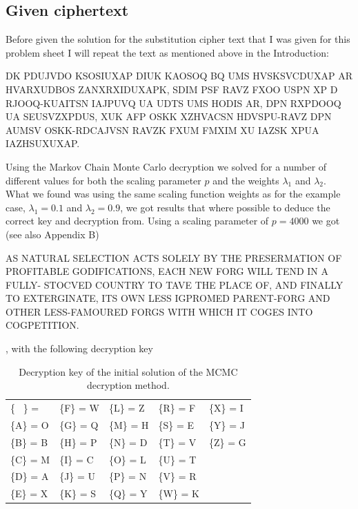 \documentclass[a4paper, 11pt]{article}
\begin{document}
\subsection{Given ciphertext}

Before given the solution for the substitution cipher text that I was given
for this problem sheet I will repeat the text as mentioned above in the
Introduction:

\begin{adjustwidth}{1.5em}{0pt}
  \small
  DK PDUJVDO KSOSIUXAP DIUK KAOSOQ BQ UMS HVSKSVCDUXAP AR
  HVARXUDBOS ZANXRXIDUXAPK, SDIM PSF RAVZ FXOO USPN XP D RJOOQ-KUAITSN 
  IAJPUVQ UA UDTS UMS HODIS AR, DPN RXPDOOQ UA SEUSVZXPDUS, XUK
  AFP OSKK XZHVACSN HDVSPU-RAVZ DPN AUMSV OSKK-RDCAJVSN RAVZK FXUM
  FMXIM XU IAZSK XPUA IAZHSUXUXAP.
\end{adjustwidth}

Using the Markov Chain Monte Carlo decryption we solved for a number of
different values for both the scaling parameter $p$ and the weights 
$\lambda_1$ and $\lambda_2$. What we found was using the same scaling function
weights as for the example case, $\lambda_1 = 0.1$ and $\lambda_2 = 0.9$,
we got results that where possible to deduce the correct key and decryption
from. Using a scaling parameter of $p = 4000$ we got (see also Appendix B)

\begin{adjustwidth}{1.5em}{0pt}
  \small
  AS NATURAL SELECTION ACTS SOLELY BY THE PRESERMATION OF
  PROFITABLE GODIFICATIONS, EACH NEW FORG WILL TEND IN A FULLY-
  STOCVED COUNTRY TO TAVE THE PLACE OF, AND FINALLY TO EXTERGINATE, ITS
  OWN LESS IGPROMED PARENT-FORG AND OTHER LESS-FAMOURED FORGS WITH
  WHICH IT COGES INTO COGPETITION.
\end{adjustwidth}

, with the following decryption key

\begin{table}[h]
  \centering
  \caption{Decryption key of the initial solution of the MCMC decryption 
  method.}
  \begin{tabular}{l l l l l}
  \{ \ \} =    &  \{F\} = W  &  \{L\} = Z  &  \{R\} = F  &  \{X\} = I  \\
  \{A\} = O  &  \{G\} = Q  &  \{M\} = H  &  \{S\} = E  &  \{Y\} = J  \\
  \{B\} = B  &  \{H\} = P  &  \{N\} = D  &  \{T\} = V  &  \{Z\} = G  \\
  \{C\} = M  &  \{I\} = C  &  \{O\} = L  &  \{U\} = T  &  \ \\
  \{D\} = A  &  \{J\} = U  &  \{P\} = N  &  \{V\} = R  &  \ \\
  \{E\} = X  &  \{K\} = S  &  \{Q\} = Y  &  \{W\} = K  &  \ \\
  \end{tabular}
  \label{tab:FirstKey}
\end{table}
\end{document}
